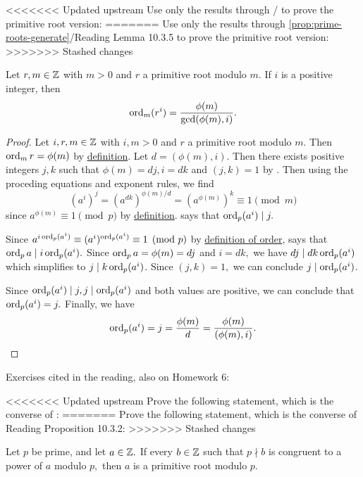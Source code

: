 \documentclass{ximera}
\begin{document}
\begin{br}
<<<<<<< Updated upstream
    Use only the results through / to prove the primitive root version:
=======
    Use only the results through \cref{prop:prime-roots-generate}/Reading Lemma 10.3.5 to prove the primitive root version:
>>>>>>> Stashed changes


    \begin{proposition}
        Let $r,m\in\mathbb Z$ with $m>0$ and $r$ a primitive root modulo $m.$
        If $i$ is a positive integer, then 
    \[\operatorname{ord}_m(r^i)=\frac{\phi(m)}{\gcd(\phi(m),i)}.\]
    
    \begin{proof}
        Let $i,r,m\in\mathbb Z$ with $i,m\gt 0$ and $r$ a primitive root modulo $m.$ Then $\operatorname{ord}_m r=\phi(m)$ by \hyperref[defn:prime-root]{definition}. Let $d=(\phi(m),i).$ Then there exists positive integers $j,k$ such that $\phi(m)=dj,i=dk$ and $(j,k)=1$ by . Then using the proceding equations and exponent rules, we find
            \[
                (a^i)^j=(a^{dk})^{\phi(m)/d}=(a^{\phi(m)})^k\equiv 1\pmod{m}
            \]
        since $a^{\phi(m)}\equiv 1\pmod{p}$ by \hyperref[defn:primeRoot]{definition}.  says that $\operatorname{ord}_p(a^i)\mid j.$

        Since $a^{i\operatorname{ord}_p(a^i)}\equiv(a^i)^{\operatorname{ord}_p(a^i)}\equiv 1\pmod{p}$ by \hyperref[defn:order]{definition of order},  says that $\operatorname{ord}_p a\mid i \operatorname{ord}_p(a^i).$ Since $\operatorname{ord}_p a=\phi(m)=dj$ and $i=dk,$ we have $dj\mid dk \operatorname{ord}_p(a^i)$ which simplifies to $j\mid k \operatorname{ord}_p(a^i)$. Since $(j,k)=1,$ we can conclude $j\mid \operatorname{ord}_p(a^i)$. 

        Since $\operatorname{ord}_p(a^i)\mid j, j\mid \operatorname{ord}_p(a^i)$ and both values are positive, we can conclude that $\operatorname{ord}_p(a^i)=j.$ Finally, we have 
            \[
                \operatorname{ord}_p(a^i)=j=\frac{\phi(m)}{d}=\frac{\phi(m)}{(\phi(m),i)}.
            \]
    \end{proof}
\end{proposition}
\end{br}


Exercises cited in the reading, also on Homework 6:



\begin{br}
<<<<<<< Updated upstream
    Prove the following statement, which is the converse of :
=======
    Prove the following statement, which is the converse of Reading Proposition 10.3.2:
>>>>>>> Stashed changes

    Let $p$ be prime, and let $a\in\mathbb Z.$ If every $b\in\mathbb Z$ such that $p\nmid b$ is congruent to a power of $a$ modulo $p,$ then ${a}$ is a primitive root modulo $p$.
    
\end{br}
\end{document}
